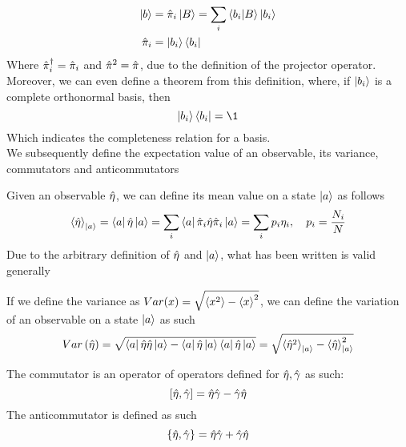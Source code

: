 \documentclass[../qm.tex]{subfiles}
\begin{document}
	\begin{equation}
		\begin{aligned}
			\ket{b}&=\hat{\pi}_i\ket{B}=\sum_i\bra{b_i}\ket{B}\ket{b_i}\\
			\hat{\pi}_i&=\ket{b_i}\bra{b_i}
		\end{aligned}
		\label{eq:projection}
	\end{equation}
	Where $\hat{\pi}_i^{\dagger}=\hat{\pi}_i$ and $\hat{\pi}^2=\hat{\pi}$, due to the definition of the projector operator.\\
	Moreover, we can even define a theorem from this definition, where, if $\ket{b_i}$ is a complete orthonormal basis, then
	\begin{equation}
		\ket{b_i}\bra{b_i}=\1
		\label{eq:completeness}
	\end{equation}
	Which indicates the completeness relation for a basis.\\
	We subsequently define the expectation value of an observable, its variance, commutators and anticommutators
	\begin{defn}
		Given an observable $\hat{\eta}$, we can define its mean value on a state $\ket{a}$ as follows
		\begin{equation}
			\expval{\hat{\eta}}_{\ket{a}}=\bra{a}\hat{\eta}\ket{a}=\sum_i\bra{a}\hat{\pi}_i\hat{\eta}\hat{\pi}_i\ket{a}=\sum_ip_i\eta_i,\quad p_i=\frac{N_i}{N}
			\label{eq:expval}
		\end{equation}
		Due to the arbitrary definition of $\hat{\eta}$ and $\ket{a}$, what has been written is valid generally
	\end{defn}
	\begin{defn}[Variance]
		If we define the variance as $Var(x)=\sqrt{\expval{x^2}-\expval{x}^2}$, we can define the variation of an observable on a state $\ket{a}$ as such
		\begin{equation}
			Var\left(\hat{\eta}\right)=\sqrt{\bra{a}\hat{\eta}\hat{\eta}\ket{a}-\bra{a}\hat{\eta}\ket{a}\bra{a}\hat{\eta}\ket{a}}=\sqrt{\expval{\hat{\eta}^2}_{\ket{a}}-\expval{\hat{\eta}}_{\ket{a}}^2}
			\label{eq:variance}
		\end{equation}
	\end{defn}
	\begin{defn}
		The commutator is an operator of operators defined for $\hat{\eta},\hat{\gamma}$ as such:
		\begin{equation}
			\comm{\opr{\eta}}{\opr{\gamma}}=\opr{\eta}\opr{\gamma}-\opr{\gamma}\opr{\eta}
			\label{eq:commutator}
		\end{equation}
		The anticommutator is defined as such
		\begin{equation}
			\acomm{\opr{\eta}}{\opr{\gamma}}=\opr{\eta}\opr{\gamma}+\opr{\gamma}\opr{\eta}
			\label{eq:anticommutator}
		\end{equation}
	\end{defn}
\end{document}

